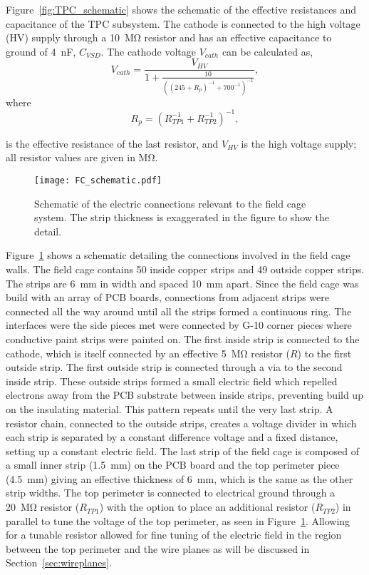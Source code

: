 Figure~\ref{fig:TPC_schematic} shows the schematic of the effective resistances and capacitance of the TPC subsystem. The cathode is connected to the high voltage (HV) supply through a \SI{10}{\mega\ohm} resistor and has an effective capacitance to ground of \SI{4}{\nano\farad}, $C_{VSD}$. The cathode voltage $V_{cath}$ can be calculated as,
\begin{equation}
V_{cath} = \frac{V_{HV}}{ 1 + \frac{10}{ \left( (245 + R_p)^{-1} + 700^{-1} \right)^{-1} } },
\end{equation}
where 
\begin{equation}
R_p = \left( R_{TP1}^{-1} + R_{TP2}^{-1} \right)^{-1},
 \label{eq:Reff}
\end{equation} 

is the effective resistance of the last resistor, and $V_{HV}$ is the high voltage supply; all resistor values are given in \si{\mega\ohm}.


\begin{figure}[!htb]
\centering
\texttt{[image: FC\_schematic.pdf]}
\caption{Schematic of the electric connections relevant to the field cage system. The strip thickness is exaggerated in the figure to show the detail.}
\label{fig:FC_schematic}
\end{figure}

Figure~\ref{fig:FC_schematic} shows a schematic detailing the connections involved in the field cage walls. The field cage contains 50 inside copper strips and 49 outside copper strips. The strips are \SI{6}{\milli\metre} in width and spaced \SI{10}{\milli\metre} apart. Since the field cage was build with an array of PCB boards, connections from adjacent strips were connected all the way around until all the strips formed a continuous ring. The interfaces were the side pieces met were connected by G-10 corner pieces where conductive paint strips were painted on. The first inside strip is connected to the cathode, which is itself connected by an effective \SI{5}{\mega\ohm} resistor ($R$) to the first outside strip. The first outside strip is connected through a via to the second inside strip. These outside strips formed a small electric field which repelled electrons away from the PCB substrate between inside strips, preventing build up on the insulating material. This pattern repeats until the very last strip. A resistor chain, connected to the outside strips, creates a voltage divider in which each strip is separated by a constant difference voltage and a fixed distance, setting up a constant electric field. The last strip of the field cage is composed of a small inner strip  (\SI{1.5}{\milli\metre}) on the PCB board and the top perimeter piece (\SI{4.5}{\milli\metre}) giving an  effective thickness of \SI{6}{\milli\metre}, which is the same as the other strip widths. The top perimeter is connected to electrical ground through a \SI{20}{\mega\ohm} resistor ($R_{TP1}$) with the option to place an additional resistor ($R_{TP2}$) in parallel to tune the voltage of the top perimeter, as seen in Figure~\ref{fig:FC_schematic}. Allowing for a tunable resistor allowed for fine tuning of the electric field in the region between the top perimeter and the wire planes as will be discussed in Section~\ref{sec:wireplanes}. 

